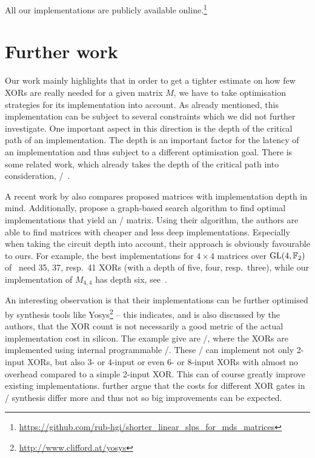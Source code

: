 All our implementations are publicly available online.\footnote{
    \url{https://github.com/rub-hgi/shorter_linear_slps_for_mds_matrices}
}

\section{Further work}
Our work mainly highlights that in order to get a tighter estimate on how few XORs are really needed for a given matrix $M$, we have to take optimisation strategies for its implementation into account.
As already mentioned, this implementation can be subject to several constraints which we did not further investigate.
One important aspect in this direction is the depth of the critical path of an implementation.
The depth is an important factor for the latency of an implementation and thus subject to a different optimisation goal.
There is some related work, which already takes the depth of the critical path into consideration, \eg/~\cite{BFA:BoyFinPer17}.

A recent work by \textcite{ToSC:DuvLeu18} also compares proposed matrices with implementation depth in mind.
Additionally, \citeauthor{ToSC:DuvLeu18} propose a graph-based search algorithm to find optimal implementations that yield an \MDS/ matrix.
Using their algorithm, the authors are able to find matrices with cheaper and less deep implementations.
Especially when taking the circuit depth into account, their approach is obviously favourable to ours.
For example, the best implementations for $4 \times 4$ matrices over $\mathrm{GL}(4, \mathbb{F}_2)$ of~\cite{ToSC:DuvLeu18} need 35, 37, resp.\ 41 XORs (with a depth of five, four, resp.\ three), while our implementation of $M_{4,4}$ has depth six, see~\cite[Table~1]{ToSC:DuvLeu18}.

An interesting observation is that their implementations can be further optimised by synthesis tools like Yosys\footnote{%
    \url{http://www.clifford.at/yosys}
} -- this indicates, and is also discussed by the authors, that the XOR count is not necessarily a good metric of the actual implementation cost in silicon.
The example \citeauthor{ToSC:DuvLeu18} give are \FPGAp/, where the XORs are implemented using internal programmable \LUTp/.
These \LUTp/ can implement not only 2-input XORs, but also 3- or 4-input or even 6- or 8-input XORs with almost no overhead compared to a simple 2-input XOR.
This can of course greatly improve existing implementations.
\citeauthor{ToSC:DuvLeu18} further argue that the costs for different XOR gates in \ASIC/ synthesis differ more and thus not so big improvements can be expected.

